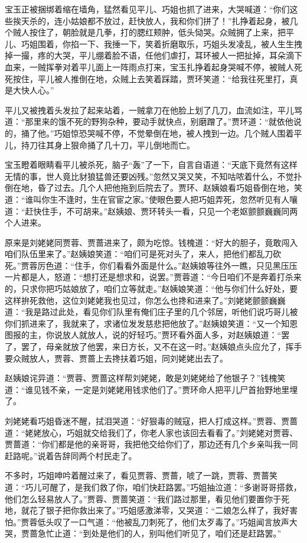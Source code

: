 \documentclass[12pt,oneside]{book}
\begin{document}
宝玉正被捆绑着缩在墙角，猛然看见平儿、巧姐也抓了进来，大哭喊道：“你们这些挨天杀的，连小姑娘都不放过，赶快放人，我和你们拼了！”扎挣着起身，被几个贼人按住了，朝脸就是几拳，打的腮红颊肿，低头恸哭。众贼拥了上来，把平儿、巧姐围着，你掐一下、我捶一下，笑着折磨取乐，巧姐头发凌乱，被人生生拽掉一撮，疼的大哭，平儿绷着脸不语，任他们虐打，耳环被人一把扯掉，耳朵滴下血来，一贼挥拳对着平儿面上一阵雨点打来，宝玉扎挣着起身哭喊不停，被贼人死死按住，平儿被人推倒在地，众贼上去笑着踩踏，贾环笑道：“给我往死里打，真是大快人心。”

平儿又被拽着头发拉了起来站着，一贼拿刀在他脸上划了几刀，血流如注，平儿骂道：“那里来的饿不死的野狗杂种，要动手就快点，别磨蹭了。”贾环道：“就依他说的，捅了他。”巧姐惊恐哭喊不停，不觉晕倒在地，被人拽到一边。几个贼人围着平儿，持刀往其身上狠命捅了几十刀，平儿倒地而亡。

宝玉瞪着眼睛看平儿被杀死，脑子“轰”了一下，自言自语道：“天底下竟然有这样无情的事，世人竟比豺狼猛兽还要凶残。”忽然又哭又笑，不知咕哝着什么，不觉扑倒在地，昏了过去。几个人把他拖到后院去了。贾环、赵姨娘看巧姐昏倒在地，笑道：“谁叫你生不逢时，生在官宦之家。”使眼色要人把巧姐弄死，忽然听见有人嚷道：“赶快住手，不可胡来。”赵姨娘、贾环转头一看，只见一个老妪颤颤巍巍同两个人进来。

原来是刘姥姥同贾蓉、贾蔷进来了，颇为吃惊。钱槐道：“好大的胆子，竟敢闯入咱们队伍里来了。”赵姨娘笑道：“咱们可是死对头了，来人，把他们都乱刀砍死。”贾蓉厉色道：“住手，你们看看外面是什么。”赵姨娘等往外一瞧，只见黑压压一片都是人，怒道：“想打还是想求和，说罢。”贾蓉道：“今日咱们不是奔着打杀来的，只求你把巧姑娘放了，咱们立等就走。”赵姨娘笑道：“他与你们什么好处，要这样拚死救他，这位刘姥姥我也见过，你怎么也搀和进来了。”刘姥姥颤颤巍巍道：“我是路过此处，看见你们队里有俺们庄子里的几个邻居，听他们说巧哥儿被你们抓进来了，我就来了，求诸位发发慈悲把他放了。”赵姨娘笑道：“又一个知恩图报的主，你说放人就放人，说的好轻巧。”贾环看外面人多，对赵姨娘道：“罢了，罢了，母亲就放了他罢，来日方长，又不在这一时。”赵姨娘点头应允了，挥手要众贼放人，贾蓉、贾蔷上去搀扶着巧姐，同刘姥姥出去了。

赵姨娘诧异道：“贾蓉、贾蔷这样帮刘姥姥，敢是刘姥姥给了他银子？”钱槐笑道：“谁见钱不亲，一定是刘姥姥用钱求他们了。”贾环命人把平儿尸首抬野地里埋了。

刘姥姥看巧姐昏迷不醒，拭泪哭道：“好狠毒的贼寇，把人打成这样。”贾蓉、贾蔷道：“姥姥放心，巧姐就交给我们了，你老人家也该回去看看了。”刘姥姥对贾蓉、贾蔷道：“你们都是他的亲哥哥，我把他交给你们了，那边还有几个乡亲叫我一同赶路呢。”说着告辞同两个村民走了。

不多时，巧姐呻吟着醒过来了，看见贾蓉、贾蔷，唬了一跳，贾蓉、贾蔷笑道：“巧儿可醒了，是我们救了你，咱们快赶路罢。”巧姐抽泣道：“多谢哥哥搭救，他们怎么轻易放人了。”贾蓉、贾蔷笑道：“我们路过那里，看见他们要置你于死地，就花了银子把你救出来了。”巧姐感激涕零，又哭道：“二娘怎么样了，我好害怕。”贾蓉低头叹了一口气道：“他被乱刀刺死了，他们太歹毒了。”巧姐闻言放声大哭，贾蔷急忙止道：“到处是他们的人，别叫他们听见了，咱们还是赶路罢。”
\end{document}
